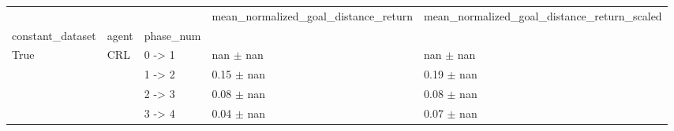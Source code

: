 \begin{tabular}{lllll}
\toprule
 &  &  & mean_normalized_goal_distance_return & mean_normalized_goal_distance_return_scaled \\
constant_dataset & agent & phase_num &  &  \\
\midrule
\multirow[t]{4}{*}{True} & \multirow[t]{4}{*}{CRL} & 0 -> 1 & nan $\pm$ nan & nan $\pm$ nan \\
 &  & 1 -> 2 & 0.15 $\pm$ nan & 0.19 $\pm$ nan \\
 &  & 2 -> 3 & 0.08 $\pm$ nan & 0.08 $\pm$ nan \\
 &  & 3 -> 4 & 0.04 $\pm$ nan & 0.07 $\pm$ nan \\
\cline{1-5} \cline{2-5}
\bottomrule
\end{tabular}
